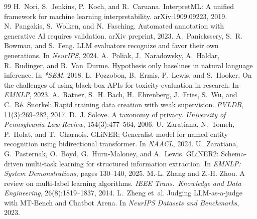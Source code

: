 \documentclass[10pt,twocolumn]{article}
\begin{document}
\begin{thebibliography}{99}
 H.~Nori, S.~Jenkins, P.~Koch, and R.~Caruana. InterpretML: A unified framework for machine learning interpretability. arXiv:1909.09223, 2019.
 N.~Pangakis, S.~Wolken, and N.~Fasching. Automated annotation with generative AI requires validation. arXiv preprint, 2023.
 A.~Panickssery, S.~R. Bowman, and S.~Feng. LLM evaluators recognize and favor their own generations. In \emph{NeurIPS}, 2024.
 A.~Poliak, J.~Naradowsky, A.~Haldar, R.~Rudinger, and B.~Van~Durme. Hypothesis only baselines in natural language inference. In \emph{*SEM}, 2018.
 L.~Pozzobon, B.~Ermis, P.~Lewis, and S.~Hooker. On the challenges of using black-box APIs for toxicity evaluation in research. In \emph{EMNLP}, 2023.
 A.~Ratner, S.~H. Bach, H.~Ehrenberg, J.~Fries, S.~Wu, and C.~R\'e. Snorkel: Rapid training data creation with weak supervision. \emph{PVLDB}, 11(3):269--282, 2017.
 D.~J. Solove. A taxonomy of privacy. \emph{University of Pennsylvania Law Review}, 154(3):477--564, 2006.
 U.~Zaratiana, N.~Tomeh, P.~Holat, and T.~Charnois. GLiNER: Generalist model for named entity recognition using bidirectional transformer. In \emph{NAACL}, 2024.
 U.~Zaratiana, G.~Pasternak, O.~Boyd, G.~Hurn-Maloney, and A.~Lewis. GLiNER2: Schema-driven multi-task learning for structured information extraction. In \emph{EMNLP: System Demonstrations}, pages 130--140, 2025.
 M.-L. Zhang and Z.-H. Zhou. A review on multi-label learning algorithms. \emph{IEEE Trans.\ Knowledge and Data Engineering}, 26(8):1819--1837, 2014.
 L.~Zheng et~al. Judging LLM-as-a-judge with MT-Bench and Chatbot Arena. In \emph{NeurIPS Datasets and Benchmarks}, 2023.
\end{thebibliography}
\end{document}

